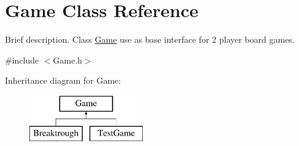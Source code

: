 \hypertarget{class_game}{\section{Game Class Reference}
\label{class_game}
}


Brief description. Class \hyperlink{class_game}{Game} use as base interface for 2 player board games.  




{\ttfamily \#include $<$Game.\-h$>$}

Inheritance diagram for Game\-:\begin{figure}[H]
\begin{center}
\leavevmode
\includegraphics[height=2.000000cm]{class_game}
\end{center}
\end{figure}
